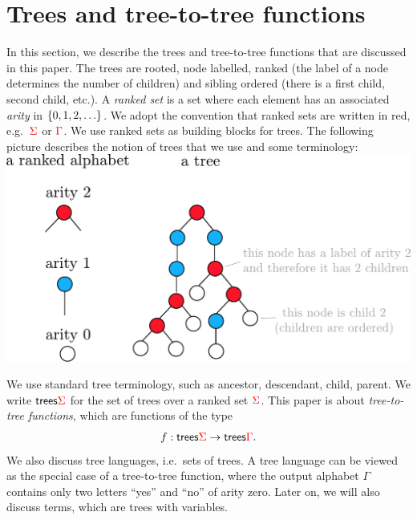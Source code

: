 \section{Trees and tree-to-tree functions}
\label{sec:trees-transductions}
 In this section, we describe the trees and tree-to-tree functions that are discussed in this paper. The  trees are rooted, node labelled, ranked (the label of a node determines the number of children) and sibling ordered (there is a first child, second child, etc.). 
A \emph{ranked set} is a set where each element has an associated \emph{arity} in $\{0,1,2,\ldots\}$. We adopt the convention that ranked sets are written in red, e.g.~${\color{red}{\Sigma}}$ or ${\color{red}{\Gamma}}$.  We use ranked sets as building blocks for trees. The following picture describes the notion of trees that we use and some terminology:\\

\includegraphics[scale=.4]{ranked-tree.pdf}


We use standard tree terminology, such as ancestor, descendant, child, parent. We write $\mathsf {trees} {\color{red}{\Sigma}}$ for the set of trees over a ranked set ${\color{red}{\Sigma}}$. This paper is about \emph{tree-to-tree functions}, which are functions of the type \begin{align*}
f : \mathsf {trees} {\color{red}{\Sigma}} \to \mathsf {trees} {\color{red}{\Gamma}}.
\end{align*}
We also discuss tree languages, i.e.~sets of trees. 
A tree language can be viewed as the special case of a tree-to-tree function, where the output alphabet $\Gamma$ contains only two letters ``yes'' and ``no'' of arity zero. Later on, we will also discuss terms, which are trees with variables. 

